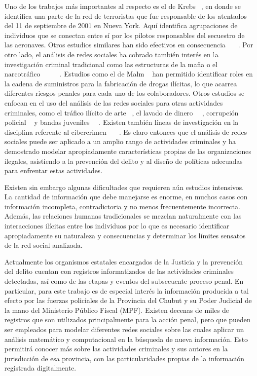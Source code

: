 Uno de los trabajos más importantes al respecto es el de Krebs ~\cite{ref_article7}, en donde se identifica una parte de la red de terroristas que fue responsable de los atentados del 11 de septiembre de 2001 en Nueva York. Aquí identifica agrupaciones de individuos que se conectan entre sí por los pilotos responsables del secuestro de las aeronaves. Otros estudios similares han sido efectivos en consecuencia ~\cite{ref_article8}~\cite{ref_article9}~\cite{ref_article10}.  Por otro lado, el análisis de redes sociales ha cobrado también interés en la investigación criminal tradicional como las estructuras de la mafia o el narcotráfico ~\cite{ref_article11}~\cite{ref_article12}~\cite{ref_article13}~\cite{ref_article14}~\cite{ref_article15}. Estudios como el de Malm ~\cite{ref_article16} han permitido identificar roles en la cadena de suministros para la fabricación de drogas ilícitas, lo que acarrea diferentes riesgos penales para cada uno de los colaboradores. Otros estudios se enfocan en el uso del análisis de las redes sociales para otras actividades criminales, como el tráfico ilícito de arte ~\cite{ref_article17}, el lavado de dinero ~\cite{ref_article18}~\cite{ref_article19}, corrupción policial ~\cite{ref_article20} y bandas juveniles ~\cite{ref_article21}~\cite{ref_article22}. Existen también líneas de investigación en la disciplina referente al cibercrimen ~\cite{ref_article23}~\cite{ref_article24}~\cite{ref_article25}. Es claro entonces que el análisis de redes sociales puede ser aplicado a un amplio rango de actividades criminales y ha demostrado modelar apropiadamente características propias de las organizaciones ilegales, asistiendo a la prevención del delito y al diseño de políticas adecuadas para enfrentar estas actividades.

Existen sin embargo algunas dificultades que requieren aún estudios intensivos. La cantidad de información que debe manejarse es enorme, en muchos casos con información incompleta, contradictoria y no menos frecuentemente incorrecta. Además, las relaciones humanas tradicionales se mezclan naturalmente con las interacciones ilícitas entre los individuos por lo que es necesario identificar apropiadamente su naturaleza y consecuencias y determinar los límites sensatos de la red social analizada. 

Actualmente los organismos estatales encargados de la Justicia y la prevención del delito cuentan con registros informatizados de las actividades criminales detectadas, así como de las etapas y eventos del subsecuente proceso penal. En particular, para este trabajo es de especial interés la información producida a tal efecto por las fuerzas policiales de la Provincia del Chubut y su Poder Judicial de la mano del Ministerio Público Fiscal (MPF). Existen decenas de miles de registros que son utilizados principalmente para la acción penal, pero que pueden ser empleados para modelar diferentes redes sociales sobre las cuales aplicar un análisis matemático y computacional en la búsqueda de nueva información. Esto permitirá conocer más sobre las actividades criminales y sus autores en la jurisdicción de esa provincia, con las particularidades propias de la información registrada digitalmente.

